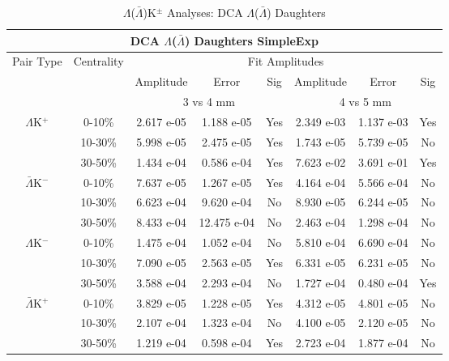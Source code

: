 \documentclass[../AnalysisNoteJBuxton.tex]{subfiles}
\begin{document}
\begin{table}
 \centering
 \begin{tabular}{|c|c|c|c|c||c|c|c|}
  \multicolumn{8}{c}{DCA $\Lambda$($\bar{\Lambda}$) Daughters SimpleExp} \\
  \hline
  \multirow{3}{*}{Pair Type} & \multirow{3}{*}{Centrality} & \multicolumn{6}{c|}{Fit Amplitudes} \\
  \cline{3-8}
   & & Amplitude & Error & Sig & Amplitude & Error & Sig \\  
  \cline{3-8}
   & & \multicolumn{3}{c||}{3 vs 4 mm} & \multicolumn{3}{c|}{4 vs 5 mm} \\  
  \hline
  \multirow{3}{*}{$\Lambda$K$^{+}$}
   &  0-10\% & 2.617 e-05 & 1.188 e-05 & Yes & 2.349 e-03 & 1.137 e-03 & Yes \\
   & 10-30\% & 5.998 e-05 & 2.475 e-05 & Yes & 1.743 e-05 & 5.739 e-05 & No \\
   & 30-50\% & 1.434 e-04 & 0.586 e-04 & Yes & 7.623 e-02 & 3.691 e-01 & Yes \\
  \hline
  \multirow{3}{*}{$\bar{\Lambda}$K$^{-}$}
   &  0-10\% & 7.637 e-05 & 1.267 e-05 & Yes & 4.164 e-04 & 5.566 e-04 & No \\
   & 10-30\% & 6.623 e-04 & 9.620 e-04 & No & 8.930 e-05 & 6.244 e-05 & No \\
   & 30-50\% & 8.433 e-04 & 12.475 e-04 & No & 2.463 e-04 & 1.298 e-04 & No \\
  \hline \hline
  \multirow{3}{*}{$\Lambda$K$^{-}$}
   &  0-10\% & 1.475 e-04 & 1.052 e-04 & No & 5.810 e-04 & 6.690 e-04 & No \\
   & 10-30\% & 7.090 e-05 & 2.563 e-05 & Yes & 6.331 e-05 & 6.231 e-05 & No \\
   & 30-50\% & 3.588 e-04 & 2.293 e-04 & No & 1.727 e-04 & 0.480 e-04 & Yes \\
  \hline
  \multirow{3}{*}{$\bar{\Lambda}$K$^{+}$}
   &  0-10\% & 3.829 e-05 & 1.228 e-05 & Yes & 4.312 e-05 & 4.801 e-05 & No \\
   & 10-30\% & 2.107 e-04 & 1.323 e-04 & No & 4.100 e-05 & 2.120 e-05 & No \\
   & 30-50\% & 1.219 e-04 & 0.598 e-04 & Yes & 2.723 e-04 & 1.877 e-04 & No \\
  \hline
 \end{tabular}
 \caption{$\Lambda$($\bar{\Lambda}$)K$^{\pm}$ Analyses: DCA $\Lambda$($\bar{\Lambda}$) Daughters}
 \label{tab:LamDaughtersDcaLamKch_SimpleExp}
\end{table}
\end{document}
